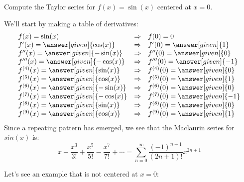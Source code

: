 \documentclass{ximera}
\begin{document}
\begin{example}
  Compute the Taylor series for $f(x) = \sin(x)$ centered at $x=0$.
  \begin{explanation}
    We'll start by making a table of derivatives:
    \[
    \begin{array}{lcl}
      f(x) = \sin(x) & \Rightarrow &f(0) = 0\\
      f'(x) = \answer[given]{\cos(x)} & \Rightarrow & f'(0) = \answer[given]{1}\\
      f''(x) = \answer[given]{-\sin(x)} &\Rightarrow &f''(0) = \answer[given]{0}\\
      f'''(x) = \answer[given]{-\cos(x)} &\Rightarrow &f'''(0) = \answer[given]{-1}\\
      f^{(4)}(x) = \answer[given]{\sin(x)} &\Rightarrow &f^{(4)}(0) = \answer[given]{0}\\
      f^{(5)}(x) = \answer[given]{\cos(x)} &\Rightarrow &f^{(5)}(0) = \answer[given]{1}\\
      f^{(6)}(x) = \answer[given]{-\sin(x)} &\Rightarrow &f^{(6)}(0) =\answer[given]{0}\\
      f^{(7)}(x) = \answer[given]{-\cos(x)} &\Rightarrow &f^{(7)}(0) = \answer[given]{-1}\\
      f^{(8)}(x) = \answer[given]{\sin(x)} &\Rightarrow &f^{(8)}(0) = \answer[given]{0}\\
      f^{(9)}(x) = \answer[given]{\cos(x)} &\Rightarrow &f^{(9)}(0) = \answer[given]{1}\\
    \end{array}
    \]
    Since a repeating pattern has emerged, we see that the Maclaurin
    series for $sin(x)$ is:
    \[
    x-\frac{x^3}{3!}+\frac{x^5}{5!}-\frac{x^7}{7!}+\cdots = \sum_{n=0}^\infty \frac{(-1)^{n+1}}{(2n+1)!} x^{2n+1}
    \]
  \end{explanation}
\end{example}


Let's see an example that is not centered at $x=0$:
\end{document}
